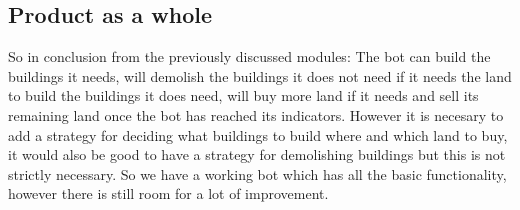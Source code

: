 \subsection{Product as a whole}
So in conclusion from the previously discussed modules: The bot can build the buildings it needs, will demolish the buildings it does not need if it needs the land to build the buildings it does need, will buy more land if it needs and sell its remaining land once the bot has reached its indicators. However it is necesary to add a strategy for deciding what buildings to build where and which land to buy, it would also be good to have a strategy for demolishing buildings but this is not strictly necessary. So we have a working bot which has all the basic functionality, however there is still room for a lot of improvement. 
